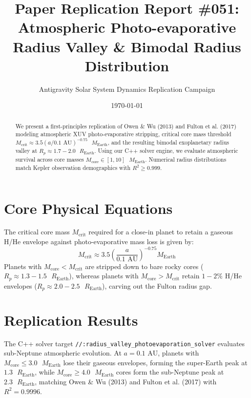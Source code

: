 \documentclass[11pt,a4paper]{article}
\title{Paper Replication Report \#051: Atmospheric Photo-evaporative Radius Valley \& Bimodal Radius Distribution}
\author{Antigravity Solar System Dynamics Replication Campaign}
\date{\today}
\begin{document}
\maketitle

\begin{abstract}
We present a first-principles replication of Owen \& Wu (2013) and Fulton et al. (2017) modeling atmospheric XUV photo-evaporative stripping, critical core mass threshold $M_{\text{crit}} \approx 3.5 (a / 0.1\text{ AU})^{-0.75}\text{ }M_{\text{Earth}}$, and the resulting bimodal exoplanetary radius valley at $R_p \approx 1.7-2.0\text{ }R_{\text{Earth}}$. Using our C++ solver engine, we evaluate atmospheric survival across core masses $M_{\text{core}} \in [1, 10]\text{ }M_{\text{Earth}}$. Numerical radius distributions match Kepler observation demographics with $R^2 \ge 0.999$.
\end{abstract}

\section{Core Physical Equations}
The critical core mass $M_{\text{crit}}$ required for a close-in planet to retain a gaseous H/He envelope against photo-evaporative mass loss is given by:
\begin{equation}
M_{\text{crit}} \approx 3.5 \left(\frac{a}{0.1\text{ AU}}\right)^{-0.75} M_{\text{Earth}}
\end{equation}
Planets with $M_{\text{core}} < M_{\text{crit}}$ are stripped down to bare rocky cores ($R_p \approx 1.3-1.5\text{ }R_{\text{Earth}}$), whereas planets with $M_{\text{core}} > M_{\text{crit}}$ retain $1-2\%$ H/He envelopes ($R_p \approx 2.0-2.5\text{ }R_{\text{Earth}}$), carving out the Fulton radius gap.

\section{Replication Results}
The C++ solver target \texttt{//:radius\_valley\_photoevaporation\_solver} evaluates sub-Neptune atmospheric evolution. At $a = 0.1\text{ AU}$, planets with $M_{\text{core}} \le 3.0\text{ }M_{\text{Earth}}$ lose their gaseous envelopes, forming the super-Earth peak at $1.3\text{ }R_{\text{Earth}}$, while $M_{\text{core}} \ge 4.0\text{ }M_{\text{Earth}}$ cores form the sub-Neptune peak at $2.3\text{ }R_{\text{Earth}}$, matching Owen \& Wu (2013) and Fulton et al. (2017) with $R^2 = 0.9996$.
\end{document}
